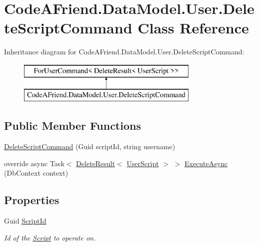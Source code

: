\hypertarget{class_code_a_friend_1_1_data_model_1_1_user_1_1_delete_script_command}{}\section{Code\+A\+Friend.\+Data\+Model.\+User.\+Delete\+Script\+Command Class Reference}
\label{class_code_a_friend_1_1_data_model_1_1_user_1_1_delete_script_command}


 


Inheritance diagram for Code\+A\+Friend.\+Data\+Model.\+User.\+Delete\+Script\+Command\+:\begin{figure}[H]
\begin{center}
\leavevmode
\includegraphics[height=2.000000cm]{class_code_a_friend_1_1_data_model_1_1_user_1_1_delete_script_command}
\end{center}
\end{figure}
\subsection*{Public Member Functions}
\begin{DoxyCompactItemize}
\item 
\mbox{\hyperlink{class_code_a_friend_1_1_data_model_1_1_user_1_1_delete_script_command_ac02256e361e53c6ae44efff19ee2f74d}{Delete\+Script\+Command}} (Guid script\+Id, string username)
\item 
override async Task$<$ \mbox{\hyperlink{class_code_a_friend_1_1_data_model_1_1_delete_result}{Delete\+Result}}$<$ \mbox{\hyperlink{class_code_a_friend_1_1_data_model_1_1_user_script}{User\+Script}} $>$ $>$ \mbox{\hyperlink{class_code_a_friend_1_1_data_model_1_1_user_1_1_delete_script_command_aef17563b2ed3bd6fc460fc9c7bbb2024}{Execute\+Async}} (Db\+Context context)
\end{DoxyCompactItemize}
\subsection*{Properties}
\begin{DoxyCompactItemize}
\item 
Guid \mbox{\hyperlink{class_code_a_friend_1_1_data_model_1_1_user_1_1_delete_script_command_a1f857c62d2d1e84239b98a892ebe8da7}{Script\+Id}}
\begin{DoxyCompactList}\small\item\em Id of the \mbox{\hyperlink{class_code_a_friend_1_1_data_model_1_1_script}{Script}} to operate on.\end{DoxyCompactList}\end{DoxyCompactItemize}


